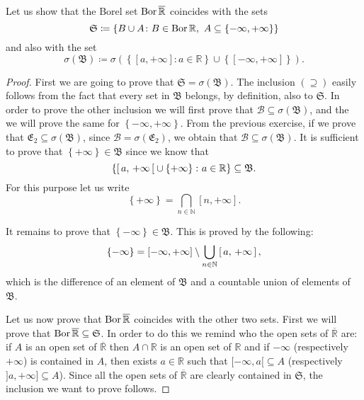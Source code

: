 \documentclass[../EserciziIstituzioniAnalisi.tex]{subfiles}
\begin{document}
\begin{exercise}[2016-10-10]
  Let us show that the Borel set $\operatorname{Bor}{\overline{\mathbb{R}}}$ coincides with the sets
  \begin{equation*}
    \mathfrak{S} \coloneqq \left\lbrace B \cup A \colon B \in \operatorname{Bor}{\mathbb{R}},\ A \subseteq \left\lbrace -\infty, +\infty\right\rbrace\right\rbrace
  \end{equation*}
  and also with the set
  \begin{equation*}
    \sigma(\mathfrak{B}) \coloneqq \sigma\left(\left\lbrace[a,+\infty] : a \in \mathbb{R}\right\rbrace \cup \left\lbrace[-\infty,+\infty]\right\rbrace\right).
  \end{equation*}
\end{exercise}
\begin{proof}
  First we are going to prove that $\mathfrak{S} = \sigma(\mathfrak{B})$.
  The inclusion $(\supseteq)$ easily follows from the fact that every set in $\mathfrak{B}$ belongs, by definition, also to $\mathfrak{S}$.
  In order to prove the other inclusion we will first prove that $\mathcal{B} \subseteq \sigma(\mathfrak{B})$, and the we will prove the same for $\left\lbrace -\infty, +\infty\right\rbrace$.
  From the previous exercise, if we prove that $\mathfrak{E_2} \subseteq \sigma(\mathfrak{B})$, since $\mathcal{B} = \sigma(\mathfrak{E_2})$, we obtain that $\mathcal{B} \subseteq \sigma(\mathfrak{B})$.
  It is sufficient to prove that $\left\lbrace +\infty\right\rbrace \in \mathfrak{B}$ since we know that
  \begin{equation*}
    \left\lbrace \left[\,a,\,+\infty\,\right[ \cup \left\lbrace +\infty\right\rbrace \colon a \in \mathbb{R}\right\rbrace \subseteq \mathfrak{B}.
  \end{equation*}
  For this purpose let us write
  \begin{equation*}
    \left\lbrace+\infty\right\rbrace = \bigcap_{n \in \mathbb{N}}[n,+\infty].
  \end{equation*}

  It remains to prove that $\left\lbrace -\infty\right\rbrace \in \mathfrak{B}$.
  This is proved by the following:
  \begin{equation*}
    \left\lbrace-\infty\right\rbrace = [-\infty,+\infty] \setminus \bigcup_{n \in \mathbb{N}}\left[\,a,\,+\infty\,\right],
  \end{equation*}
  which is the difference of an element of $\mathfrak{B}$ and a countable union of elements of $\mathfrak{B}$.
 
  Let us now prove that $\operatorname{Bor}{\overline{\mathbb{R}}}$ coincides with the other two sets.
  First we will prove that $\operatorname{Bor}{\overline{\mathbb{R}}} \subseteq \mathfrak{S}$.
  In order to do this we remind who the open sets of $\overline{\mathbb{R}}$ are: if $A$ is an open set of $\overline{\mathbb{R}}$ then $A \cap \mathbb{R}$ is an open set of $\mathbb{R}$ and if $-\infty$ (respectively $+\infty$) is contained in $A$, then exists $a \in \mathbb{R}$ such that $[-\infty,a[ \subseteq A$ (respectively $]a,+\infty] \subseteq A$).
Since all the open sets of $\overline{\mathbb{R}}$ are clearly contained in $\mathfrak{S}$, the inclusion we want to prove follows.


\end{proof}
\end{document}
